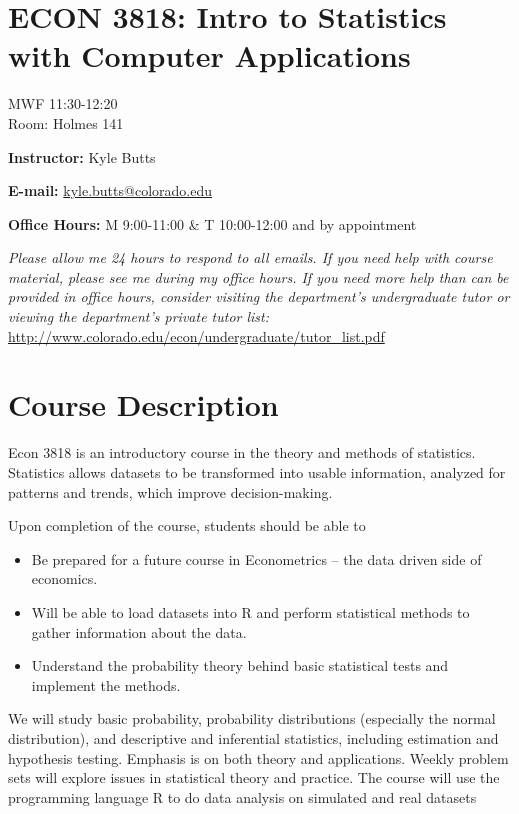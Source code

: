 \documentclass[12pt]{article}
\date{\today}
\begin{document}
\section*{ECON 3818: Intro to Statistics with Computer Applications}
\begin{center}
	MWF 11:30-12:20 \\ Room: Holmes 141
\end{center}

\vspace{.2cm}
\noindent \textbf{Instructor:} Kyle Butts

\noindent \textbf{E-mail:} \href{mailto:kyle.butts@colorado.edu}{kyle.butts@colorado.edu}

\noindent \textbf{Office Hours:} M 9:00-11:00 \& T 10:00-12:00 and by appointment

\vspace{5mm} \noindent \textit{Please allow me 24 hours to respond to all emails. If you need help with course material, please see me during my office hours. If you need more help than can be provided in office hours, consider visiting the department's undergraduate tutor or viewing the department's private tutor list:} \url{http://www.colorado.edu/econ/undergraduate/tutor_list.pdf}

\section*{Course Description}
Econ 3818 is an introductory course in the theory and methods of statistics. Statistics allows datasets to be transformed into usable information, analyzed for patterns and trends, which improve decision-making.

Upon completion of the course, students should be able to

\begin{itemize}
    \item Be prepared for a future course in Econometrics -- the data driven side of economics.
    \item Will be able to load datasets into R and perform statistical methods to gather information about the data.
    \item Understand the probability theory behind basic statistical tests and implement the methods.
\end{itemize}
    
We will study basic probability, probability distributions (especially the normal distribution), and descriptive and inferential statistics, including estimation and hypothesis testing. Emphasis is on both theory and applications. Weekly problem sets will explore issues in statistical theory and practice. The course will use the programming language R to do data analysis on simulated and real datasets
\end{document}

